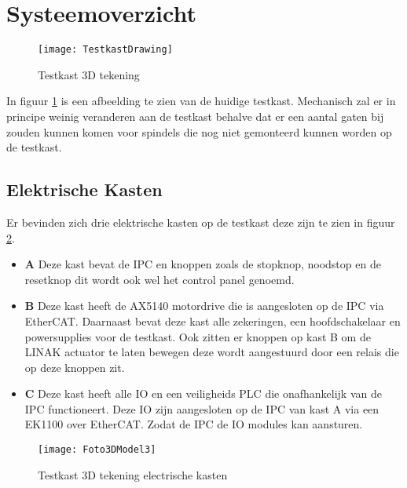 \section{Systeemoverzicht}

\begin{figure}[H]
	\centering
	\texttt{[image: TestkastDrawing]}
	\label{fig:TestkastDrawing}
	\caption{Testkast 3D tekening}
\end{figure}

In figuur \ref{fig:TestkastDrawing} is een afbeelding te zien van de huidige testkast. Mechanisch zal er in principe weinig veranderen aan de testkast behalve dat er een aantal gaten bij zouden kunnen komen voor spindels die nog niet gemonteerd kunnen worden op de testkast.

\vspace{0.5cm}

\newpage

\subsection{Elektrische Kasten}

Er bevinden zich drie elektrische kasten op de testkast deze zijn te zien in figuur \ref{fig:Foto3DModel3}.

\begin{itemize}
	\item \textbf{A} Deze kast bevat de \gls{IPC} en knoppen zoals de stopknop, noodstop en de resetknop dit wordt ook wel het control panel genoemd.
	\item \textbf{B} Deze kast heeft de \gls{AX5140} motordrive die is aangesloten op de \gls{IPC} via \gls{EtherCAT}. Daarnaast bevat deze kast alle zekeringen, een hoofdschakelaar en powersupplies voor de testkast. Ook zitten er knoppen op kast B om de LINAK actuator te laten bewegen deze wordt aangestuurd door een relais die op deze knoppen zit.
	\item \textbf{C} Deze kast heeft alle \gls{IO} en een veiligheids \gls{PLC} die onafhankelijk van de \gls{IPC} functioneert. Deze \gls{IO} zijn aangesloten op de \gls{IPC} van kast A via een EK1100 over \gls{EtherCAT}. Zodat de \gls{IPC} de \gls{IO} modules kan aansturen. 
\end{itemize}

\begin{figure}[H]
	\centering
	\texttt{[image: Foto3DModel3]}
	\label{fig:Foto3DModel3}
	\caption{Testkast 3D tekening electrische kasten}
\end{figure}

